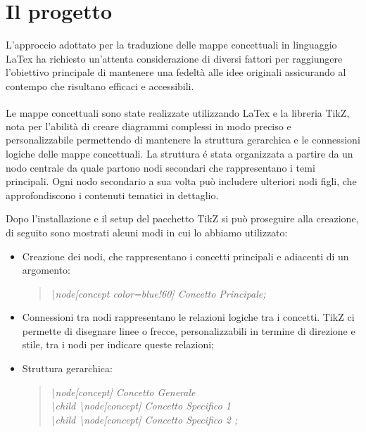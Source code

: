 \documentclass[portrait,a4paper]{article} %
\begin{document}
\newpage
{}

\section{Il progetto}  
L’approccio adottato per la traduzione delle mappe concettuali in linguaggio LaTex ha richiesto un’attenta considerazione di diversi fattori per raggiungere l’obiettivo principale di mantenere una fedeltà alle idee originali assicurando al contempo che risultano efficaci e accessibili.
\par
Le mappe concettuali sono state realizzate utilizzando LaTex e la libreria TikZ\textsuperscript{\cite{Tikz}}, nota per l’abilità di creare diagrammi complessi in modo preciso e personalizzabile permettendo di mantenere la struttura gerarchica e le connessioni logiche delle mappe concettuali. La struttura \'{e} stata organizzata a partire da un nodo centrale da quale partono nodi secondari che rappresentano i temi principali. Ogni nodo secondario a sua volta può includere ulteriori nodi figli, che approfondiscono i contenuti tematici in dettaglio.
\par
Dopo l’installazione e il setup del pacchetto TikZ si può proseguire alla creazione, di seguito sono mostrati alcuni modi in cui lo abbiamo utilizzato:
\begin{itemize} 
    \item Creazione dei nodi, che rappresentano i concetti principali e adiacenti di un argomento:
        \begin{quote}
            \textit{\textbackslash node[concept color=blue!60] {Concetto Principale};}
        \end{quote}
    \item Connessioni tra nodi rappresentano le relazioni logiche tra i concetti. TikZ ci permette di disegnare linee o frecce, personalizzabili in termine di direzione e stile, tra i nodi per indicare queste relazioni;
    \item Struttura gerarchica:
        \begin{quote}
            \textit{\textbackslash node[concept] {Concetto Generale}\\
               	    \textbackslash child { \textbackslash node[concept] {Concetto Specifico 1} }\\
                        \textbackslash child { \textbackslash node[concept] {Concetto Specifico 2} };}
        \end{quote}
\end{itemize}
\end{document}
